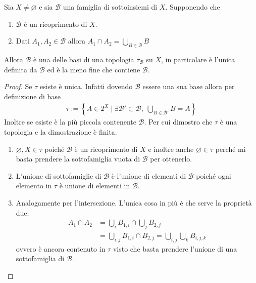 \begin{theorem}
	\label{thr:set_simil_base_generate_top}
	Sia $X \neq \varnothing$ e sia $\mathcal{B}$ una famiglia di sottoinsiemi di $X$. Supponendo che 
	\begin{enumerate}
		\item $\mathcal{B}$ è un ricoprimento di $X$.
		\item Dati $A_1, A_2 \in \mathcal{B}$ allora $A_1 \cap A_2 = \bigcup_{B \in \mathcal{B}} B$  
	\end{enumerate}
	Allora $\mathcal{B}$ è una delle basi di una topologia $\tau_\mathcal{B}$ su $X$, in particolare è l'unica definita da $\mathcal{B}$ ed è la meno fine che contiene $\mathcal{B}$.
\end{theorem}
\begin{proof}
	Se $\tau$ esiste è unica. Infatti dovendo $\mathcal{B}$ essere una sua base allora per definizione di base 
	\begin{equation}
	\begin{aligned}	
		\tau := \left\{A \in 2^X \; | \; \exists \mathcal{B}' \subset \mathcal{B} , \; \bigcup_{B \in \mathcal{B}'} B = A \right\}
	\end{aligned}
	\end{equation}
	Inoltre se esiste è la più piccola contenente $\mathcal{B}$.
	Per cui dimostro che $\tau$ è una topologia e la dimostrazione è finita.
	\begin{enumerate}
		\item $\varnothing, X \in \tau$ poiché $\mathcal{B}$ è un ricoprimento di $X$ e inoltre anche $\varnothing \in \tau$ perché mi basta prendere la sottofamiglia vuota di $\mathcal{B}$ per ottenerlo.
		\item L'unione di sottofamiglie di $\mathcal{B}$ è l'unione di elementi di $\mathcal{B}$ poiché ogni elemento in $\tau$ è unione di elementi in $\mathcal{B}$.
		\item Analogamente per l'intersezione. L'unica cosa in più è che serve la proprietà due:
		\begin{equation}
		\begin{aligned}
			A_1 \cap A_2 & = \bigcup_{i} B_{1,i} \cap \bigcup_{j} B_{2,j} \\
				& = \bigcup_{i,j} B_{1,i} \cap B_{2,j} = \bigcup_{i,j} \bigcup_{k} B_{i,j,k}
		\end{aligned}
		\end{equation}
		ovvero è ancora contenuto in $\tau$ visto che basta prendere l'unione di una sottofamiglia di $\mathcal{B}$.
	\end{enumerate}
\end{proof}


